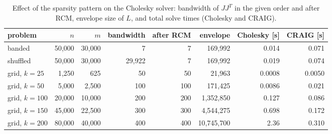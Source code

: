 \begin{table}[htbp]
\centering
\caption{Effect of the sparsity pattern on the Cholesky solver: bandwidth of $JJ^T$ in the given order and after RCM, envelope size of $L$, and total solve times (Cholesky and CRAIG).}
\label{tab:sparsity}
\small
\begin{tabular}{@{}lrrrrrrr@{}}
\toprule
problem & $n$ & $m$ & bandwidth & after RCM & envelope & Cholesky [s] & CRAIG [s] \\
\midrule
banded & 50{,}000 & 30{,}000 & 7 & 7 & 169{,}992 & 0.014 & 0.071 \\
shuffled & 50{,}000 & 30{,}000 & 29{,}922 & 7 & 169{,}992 & 0.019 & 0.074 \\
grid{,} $k=25$ & 1{,}250 & 625 & 50 & 50 & 21{,}963 & 0.0008 & 0.0050 \\
grid{,} $k=50$ & 5{,}000 & 2{,}500 & 100 & 100 & 171{,}425 & 0.0086 & 0.021 \\
grid{,} $k=100$ & 20{,}000 & 10{,}000 & 200 & 200 & 1{,}352{,}850 & 0.127 & 0.086 \\
grid{,} $k=150$ & 45{,}000 & 22{,}500 & 300 & 300 & 4{,}544{,}275 & 0.698 & 0.172 \\
grid{,} $k=200$ & 80{,}000 & 40{,}000 & 400 & 400 & 10{,}745{,}700 & 2.36 & 0.310 \\
\bottomrule
\end{tabular}
\end{table}
